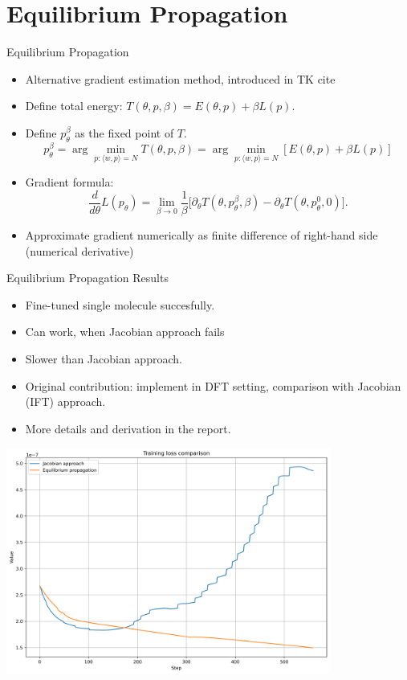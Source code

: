 \documentclass{beamer}
\begin{document}
\section{Equilibrium Propagation}
\begin{frame}{Equilibrium Propagation}
  \begin{itemize}
    \item Alternative gradient estimation method, introduced in TK cite
    \item Define total energy: $T(\theta, p, \beta) = E(\theta, p) + \beta L(p)$.
    \item Define $p_{\theta}^{\beta}$ as the fixed point of $T$.
    \[
      p_{\theta}^{\beta} = \arg\min_{p:\langle w,p \rangle = N} T(\theta, p, \beta) = \arg\min_{p:\langle w,p \rangle = N} [E(\theta, p) + \beta L(p)]
    \]
    \item Gradient formula:
    \[
      \frac{d}{d\theta} L(p_{\theta}) = \lim_{\beta \to 0} \frac{1}{\beta} \Big[ \partial_{\theta}T(\theta, p^{\beta}_{\theta}, \beta) - \partial_{\theta}T(\theta, p^{0}_{\theta}, 0) \Big].
    \]
    \item Approximate gradient numerically as finite difference of right-hand side (numerical derivative)
  \end{itemize}
\end{frame}

\begin{frame}{Equilibrium Propagation Results}
  \begin{itemize}
    \item Fine-tuned single molecule succesfully.
    \item Can work, when Jacobian approach fails
    \item Slower than Jacobian approach.
    \item Original contribution: implement in DFT setting, comparison with Jacobian (IFT) approach.
    \item More details and derivation in the report.
  \end{itemize}

\end{frame}

\begin{frame}

 \begin{center}
    \includegraphics[width=0.8\textwidth]{images/loss_comparison.png} %
  \end{center}
\end{frame}
\end{document}
